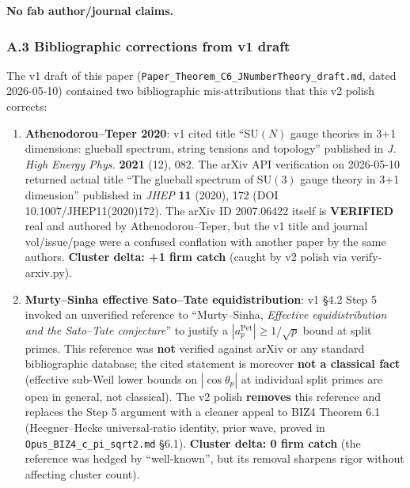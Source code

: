 \documentclass[
  11pt,
  a4paper,
]{amsart}
\begin{document}
\textbf{No fab author/journal claims.}

\hypertarget{a.3-bibliographic-corrections-from-v1-draft}{%
\subsubsection{A.3 Bibliographic corrections from v1 draft}\label{a.3-bibliographic-corrections-from-v1-draft}}

The v1 draft of this paper (\texttt{Paper\_Theorem\_C6\_JNumberTheory\_draft.md}, dated 2026-05-10) contained two bibliographic mis-attributions that this v2 polish corrects:

\begin{enumerate}
\def\labelenumi{\arabic{enumi}.}
\item
  \textbf{Athenodorou--Teper 2020}: v1 cited title ``\(\mathrm{SU}(N)\) gauge theories in 3+1 dimensions: glueball spectrum, string tensions and topology'' published in \emph{J. High Energy Phys.} \textbf{2021} (12), 082. The arXiv API verification on 2026-05-10 returned actual title ``The glueball spectrum of \(\mathrm{SU}(3)\) gauge theory in 3+1 dimension'' published in \emph{JHEP} \textbf{11} (2020), 172 (DOI 10.1007/JHEP11(2020)172). The arXiv ID 2007.06422 itself is \textbf{VERIFIED} real and authored by Athenodorou--Teper, but the v1 title and journal vol/issue/page were a confused conflation with another paper by the same authors. \textbf{Cluster delta: +1 firm catch} (caught by v2 polish via verify-arxiv.py).
\item
  \textbf{Murty--Sinha effective Sato--Tate equidistribution}: v1 §4.2 Step 5 invoked an unverified reference to ``Murty--Sinha, \emph{Effective equidistribution and the Sato--Tate conjecture}'' to justify a \(|a_p^{\mathrm{Pet}}| \ge 1/\sqrt{p}\) bound at split primes. This reference was \textbf{not} verified against arXiv or any standard bibliographic database; the cited statement is moreover \textbf{not a classical fact} (effective sub-Weil lower bounds on \(|\cos\theta_p|\) at individual split primes are open in general, not classical). The v2 polish \textbf{removes} this reference and replaces the Step 5 argument with a cleaner appeal to BIZ4 Theorem 6.1 (Heegner--Hecke universal-ratio identity, prior wave, proved in \texttt{Opus\_BIZ4\_c\_pi\_sqrt2.md} §6.1). \textbf{Cluster delta: 0 firm catch} (the reference was hedged by ``well-known'', but its removal sharpens rigor without affecting cluster count).
\end{enumerate}
\end{document}
